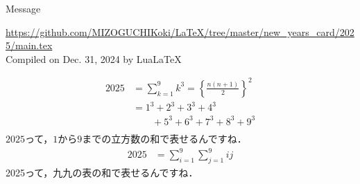 \documentclass[twocolumn,fontsize=9pt]{jlreq}
\begin{document}
\begin{itembox}[l]{\small Message}
    \vspace{3.1cm}
\end{itembox}
\noindent\scriptsize{\url{https://github.com/MIZOGUCHIKoki/LaTeX/tree/master/new_years_card/2025/main.tex}\\\hfill Compiled on Dec. 31, 2024 by Lua\LaTeX}

\newpage
\fontsize{10pt}{10pt}\selectfont
\begin{align*}
    2025 & = \sum_{k=1}^{9} k^3 = \left\{\frac{n(n+1)}{2}\right\}^2 \\
         & = 1^3 + 2^3 + 3^3 + 4^3                                  \\
         & \quad\quad + 5^3 + 6^3 + 7^3 + 8^3 + 9^3                 \\
\end{align*}
\scriptsize \(2025\)って，\(1\)から\(9\)までの立方数の和で表せるんですね\footnotemark[1]．
\fontsize{10pt}{10pt}\selectfont
\begin{align*}
    2025 & = \sum_{i=1}^{9}\sum _{j=1}^{9}ij
\end{align*}
\scriptsize 2025って，九九の表の和で表せるんですね\footnotemark[1]．

\end{document}
